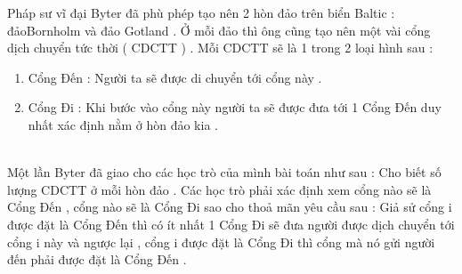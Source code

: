 Pháp sư vĩ đại Byter đã phù phép tạo nên 2 hòn đảo trên biển Baltic : đảoBornholm và đảo Gotland . Ở mỗi đảo thì ông cũng tạo nên một vài cổng dịch chuyển tức thời ( CDCTT ) . Mỗi CDCTT sẽ là 1 trong 2 loại hình sau :
\begin{enumerate}
	\item Cổng Đến : Người ta sẽ được di chuyển tới cổng này .
	\item Cổng Đi : Khi bước vào cổng này người ta sẽ được đưa tới 1 Cổng Đến duy nhất xác định nằm ở hòn đảo kia .
\end{enumerate}


\\Một lần Byter đã giao cho các học trò của mình bài toán như sau : Cho biết số lượng CDCTT ở mỗi hòn đảo . Các học trò phải xác định xem cổng nào sẽ là Cổng Đến , cổng nào sẽ là Cổng Đi sao cho thoả mãn yêu cầu sau : Giả sử cổng i được đặt là Cổng Đến thì có ít nhất 1 Cổng Đi sẽ đưa người được dịch chuyển tới cổng i này và ngược lại , cổng i được đặt là Cổng Đi thì cổng mà nó gửi người đến phải được đặt là Cổng Đến .